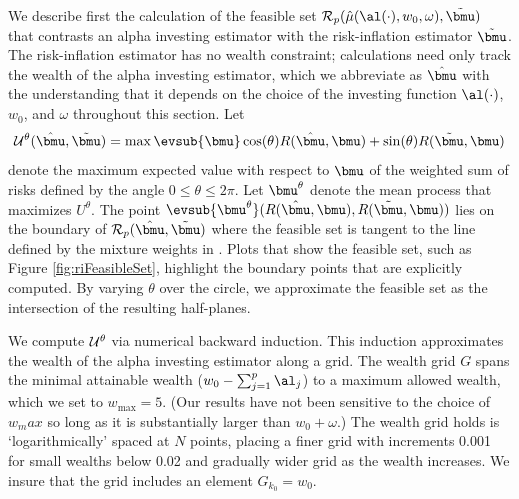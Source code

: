 \documentclass[12pt]{article}
\begin{document}
 We describe first the calculation of the feasible set ${\cal R}_p(\hat\mu(
 \al(\cdot), w_0, \omega), \tilde{\bmu})$ that contrasts an alpha investing
 estimator with the risk-inflation estimator $\tilde{\bmu}$.  The risk-inflation
 estimator has no wealth constraint; calculations need only track the wealth of
 the alpha investing estimator, which we abbreviate as $\hat{\bmu}$ with the
 understanding that it depends on the choice of the investing function
 $\al(\cdot)$, $w_0$, and $\omega$ throughout this section.  Let
 \begin{equation}
   {\cal U}^\theta(\hat{\bmu},\tilde{\bmu}) = 
       \max \evsub{\bmu} 
       \cos(\theta) R(\hat{\bmu}, \bmu) + \sin(\theta) R(\tilde{\bmu},\bmu) 
 \label{eq:U}
 \end{equation}
 denote the maximum expected value with respect to $\bmu$ of the weighted sum of
 risks defined by the angle $ 0 \le \theta \le 2 \pi$.  Let $\bmu^\theta$ denote
 the mean process that maximizes $U^\theta$.  The point
 $\evsub{\bmu^\theta}(R(\hat{\bmu}, \bmu), R(\tilde{\bmu}, \bmu))$ lies on
 the boundary of ${\cal R}_p(\hat{\bmu},\tilde{\bmu})$ where the feasible set is
 tangent to the line defined by the mixture weights in .  Plots that
 show the feasible set, such as Figure \ref{fig:riFeasibleSet}, highlight the
 boundary points that are explicitly computed.  By varying $\theta$ over the
 circle, we approximate the feasible set as the intersection of the resulting
 half-planes.

 
 We compute ${\cal U}^\theta$ via numerical backward induction.  This induction
 approximates the wealth of the alpha investing estimator along a grid.  The
 wealth grid $G$ spans the minimal attainable wealth ($w_0 - \sum_{j=1}^p
 \al_j$) to a maximum allowed wealth, which we set to $w_{\max} = 5$.  (Our
 results have not been sensitive to the choice of $w_max$ so long as it is
 substantially larger than $w_0 + \omega$.)  The wealth grid holds is
 `logarithmically' spaced at $N$ points, placing a finer grid with increments
 0.001 for small wealths below 0.02 and gradually wider grid as the wealth
 increases.  We insure that the grid includes an element $G_{k_0} = w_0$.
\end{document}
